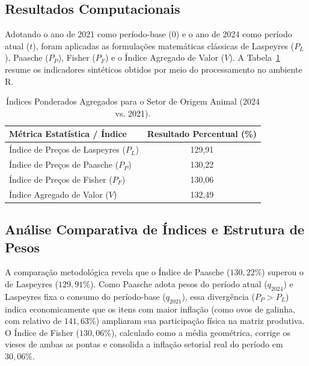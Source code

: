 \documentclass[12pt,a4paper]{article}
\begin{document}
\subsection{Resultados Computacionais}

Adotando o ano de 2021 como período-base ($0$) e o ano de 2024 como período atual ($t$), foram aplicadas as formulações matemáticas clássicas de Laspeyres ($P_L$), Paasche ($P_P$), Fisher ($P_F$) e o Índice Agregado de Valor ($V$). A Tabela~\ref{tab:indices_ponderados_resumo} resume os indicadores sintéticos obtidos por meio do processamento no ambiente R.

\begin{table}[H]
\centering
\caption{Índices Ponderados Agregados para o Setor de Origem Animal (2024 vs. 2021).}
\label{tab:indices_ponderados_resumo}
\begin{tabular}{lc}
\toprule
\textbf{Métrica Estatística / Índice} & \textbf{Resultado Percentual (\%)} \\
\midrule
Índice de Preços de Laspeyres ($P_L$) & 129,91 \\
Índice de Preços de Paasche ($P_P$)   & 130,22 \\
Índice de Preços de Fisher ($P_F$)    & 130,06 \\
Índice Agregado de Valor ($V$)        & 132,49 \\
\bottomrule
\end{tabular}
\end{table}

\subsection{Análise Comparativa de Índices e Estrutura de Pesos}

A comparação metodológica revela que o Índice de Paasche ($130{,}22\%$) superou o de Laspeyres ($129{,}91\%$). Como Paasche adota pesos do período atual ($q_{2024}$) e Laspeyres fixa o consumo do período-base ($q_{2021}$), essa divergência ($P_P > P_L$) indica economicamente que os itens com maior inflação (como ovos de galinha, com relativo de $141{,}63\%$) ampliaram sua participação física na matriz produtiva. O Índice de Fisher ($130{,}06\%$), calculado como a média geométrica, corrige os vieses de ambas as pontas e consolida a inflação setorial real do período em $30{,}06\%$.
\end{document}
